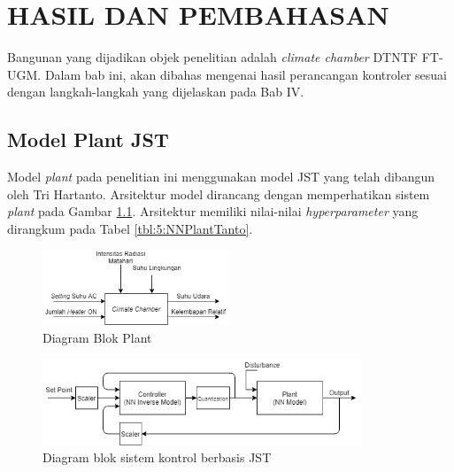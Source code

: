 \chapter{HASIL DAN PEMBAHASAN}
\label{hasil-dan-pembahasan}
Bangunan yang dijadikan objek penelitian adalah \textit{climate chamber} DTNTF FT-UGM. Dalam bab ini, akan dibahas mengenai hasil perancangan kontroler sesuai dengan langkah-langkah yang dijelaskan pada Bab IV.

\section{Model Plant JST}

Model \textit{plant} pada penelitian ini menggunakan model JST yang telah dibangun oleh Tri Hartanto\cite{skripsiTanto}. Arsitektur model dirancang dengan memperhatikan sistem \textit{plant} pada Gambar \ref{fig:5:DiagramBlokPlant}. Arsitektur memiliki nilai-nilai \textit{hyperparameter} yang dirangkum pada Tabel \ref{tbl:5:NNPlantTanto}.

\begin{figure}[!h]
	\centering
	\includegraphics[width=0.5\textwidth]{figures/BlokDiagramPlant}
	\caption{Diagram Blok Plant}
	\label{fig:5:DiagramBlokPlant}
\end{figure}

\begin{figure}[!h]
	\centering
	\includegraphics[width=0.85\textwidth]{figures/ControlDesignDiagramII}
	\caption{Diagram blok sistem kontrol berbasis JST}
	\label{fig:5:ConstrolSystemBlockDiagram}
\end{figure}

